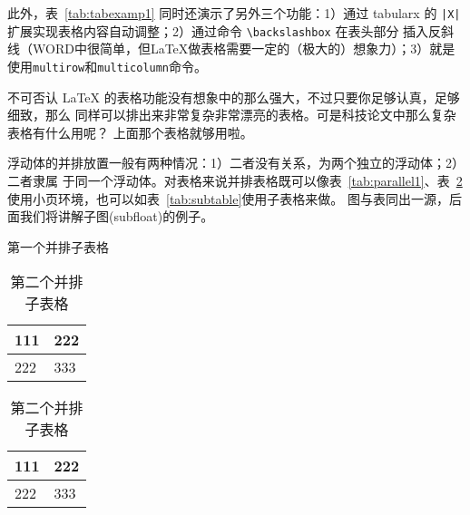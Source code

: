 此外，表~\ref{tab:tabexamp1} 同时还演示了另外三个功能：1）通过 \textsf{tabularx} 的
 \texttt{|X|} 扩展实现表格内容自动调整；2）通过命令 \verb|\backslashbox| 在表头部分
插入反斜线（WORD中很简单，但\LaTeX{}做表格需要一定的（极大的）想象力）；3）就是
使用\verb|multirow|和\verb|multicolumn|命令。

不可否认 \LaTeX{} 的表格功能没有想象中的那么强大，不过只要你足够认真，足够细致，那么
同样可以排出来非常复杂非常漂亮的表格。可是科技论文中那么复杂表格有什么用呢？
上面那个表格就够用啦。

浮动体的并排放置一般有两种情况：1）二者没有关系，为两个独立的浮动体；2）二者隶属
于同一个浮动体。对表格来说并排表格既可以像表~\ref{tab:parallel1}、表~\ref{tab:parallel2} 
使用小页环境，也可以如表~\ref{tab:subtable}使用子表格来做。
图与表同出一源，后面我们将讲解子图(subfloat)的例子。
\begin{table}[htb]
\centering
\noindent\begin{minipage}{0.45\textwidth}
\centering
\caption{第一个并排子表格}
\label{tab:parallel1}
\begin{tabular}{p{2cm}p{2cm}}
\toprule[1.5pt]
111 & 222 \\\midrule[1pt]
222 & 333 \\\bottomrule[1.5pt]
\end{tabular}
\end{minipage}
\begin{minipage}{0.45\textwidth}
\centering
\caption{第二个并排子表格}
\label{tab:parallel2}
\begin{tabular}{p{2cm}p{2cm}}
\toprule[1.5pt]
111 & 222 \\\midrule[1pt]
222 & 333 \\\bottomrule[1.5pt]
\end{tabular}
\end{minipage}
\end{table}
\begin{table}[htbp]
\centering
\caption{并排子表格}
\label{tab:subtable}
\hskip2cm
\end{table}

